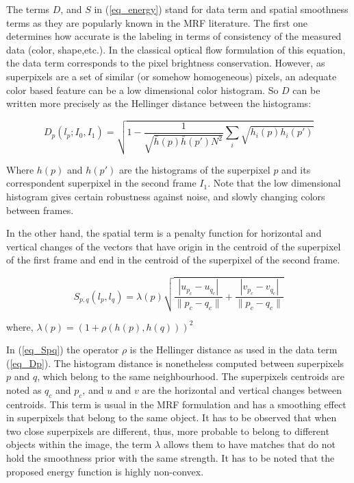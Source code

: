 The terms $D$, and $S$ in (\ref{eq_energy}) stand for data term and spatial smoothness terms as they
are popularly known in the MRF literature. The first one determines how accurate is the labeling in terms
of consistency of the measured data (color, shape,etc.). In the classical optical flow formulation of this equation,
the data term corresponds to the pixel brightness conservation\cite{c7}\cite{c5}. However, as superpixels are a set
of similar (or somehow homogeneous) pixels, an adequate color based feature can be a low dimensional
color histogram. So $D$ can be written more precisely as the Hellinger distance between the histograms:

\begin{equation}
D_p(l_p;I_0,I_1) = \sqrt{ 1 - \frac{1}{\sqrt{\bar{h}(p)\bar{h}(p')N^2} } \sum_{i}\sqrt{h_{i}(p)h_{i}(p')} }
\label{eq_Dp}
\end{equation}

Where $h(p)$ and $h(p')$ are the histograms of the superpixel $p$ and its correspondent superpixel in the
second frame $I_1$. %
Note that the low dimensional histogram gives certain robustness against noise,
and slowly changing colors between frames. 

In the other hand, the spatial term is a penalty function for horizontal
and vertical changes of the vectors that have origin in the centroid of the superpixel of the first frame and
end in the centroid of the superpixel of the second frame.

\begin{equation}
S_{p,q}(l_p, l_q) = \lambda(p)
  \sqrt{\frac{|u_{p_c}-u_{q_c}|}{\|p_c-q_c\|}+ \frac{|v_{p_c}-v_{q_c}|}{\|p_c-q_c\|}}
\label{eq_Spq}
\end{equation}
\begin{center}
 where, $ \lambda(p) = (1 + \rho(h(p),h(q)))^2 $ \\
\end{center}

In (\ref{eq_Spq}) the operator $\rho$ is the Hellinger distance as used in the
data term (\ref{eq_Dp}). The histogram distance is nonetheless computed between superpixels $p$ and $q$, 
which belong to the same neighbourhood. The superpixels centroids are noted as $q_c$ and $p_c$, 
and $u$ and $v$ are the horizontal and vertical changes between centroids.
This term is usual in the MRF formulation and has a smoothing effect in superpixels that belong to the
same object. It has to be observed that when two close superpixels are different, thus, more probable to
belong to different objects within the image, the term $\lambda$ allows them to have
matches that do not hold the smoothness prior with the same strength. 
It has to be noted that the proposed energy function is highly non-convex.

